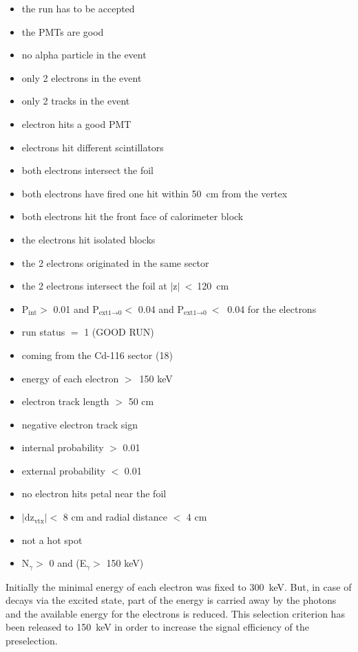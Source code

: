 \documentclass[main.tex]{subfiles}
\begin{document}
\begin{multicols}{2}
\begin{itemize}
\item the run has to be accepted
\item the PMTs are good 
\item no alpha particle in the event
\item only 2 electrons in the event 
\item only 2 tracks in the event 
\item electron hits a good PMT 
\item electrons hit different scintillators
\item both electrons intersect the foil
\item both electrons have fired one hit within 50~cm from the vertex
\item both electrons hit the front face of calorimeter block
\item the electrons hit isolated blocks
\item the 2 electrons originated in the same sector 
\item the 2 electrons intersect the foil at $|\text{z}|~<~$120~cm  
\item P$_{\text{int}} > $ 0.01 and P$_{\text{ext1} \rightarrow \text{0}} < $ 0.04 and P$_{\text{ext1} \rightarrow \text{0}}~<~$ 0.04 for the electrons 
\item run status $=$ 1 (GOOD RUN)  
\item coming from the Cd-116 sector (18)  
\item energy of each electron $>$~150 keV   
\item electron track length $> $ 50 cm   
\item negative electron track sign   
\item internal probability $>$ 0.01     
\item external probability $<$ 0.01   
\item no electron hits petal near the foil   
\item $|\text{dz}_\text{vtx}| < $ 8 cm and radial distance $ <$ 4 cm     
\item not a hot spot    
\item N$_{\gamma} >$ 0 and (E$_{\gamma}>$ 150 keV)  
 
\end{itemize}
\end{multicols}


\NI Initially the minimal energy of each electron was fixed to 300~keV. But, in case of decays via the excited state, part of the energy is carried away by the photons and the available energy for the electrons is reduced. This selection criterion has been released to 150~keV in order to increase the signal efficiency of the preselection.
\end{document}
